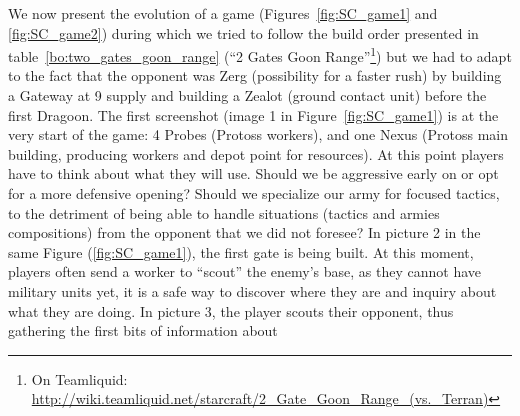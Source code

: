 We now present the evolution of a game (Figures~\ref{fig:SC_game1} and \ref{fig:SC_game2}) during which we tried to follow the build order presented in table~\ref{bo:two_gates_goon_range} (``2 Gates Goon Range''\footnote{On Teamliquid: \url{http://wiki.teamliquid.net/starcraft/2_Gate_Goon_Range_(vs._Terran)}}) but we had to adapt to the fact that the opponent was Zerg (possibility for a faster rush) by building a Gateway at 9 supply and building a Zealot (ground contact unit) before the first Dragoon. The first screenshot (image 1 in Figure~\ref{fig:SC_game1}) is at the very start of the game: 4 Probes (Protoss workers), and one Nexus (Protoss main building, producing workers and depot point for resources). At this point players have to think about what  they will use. Should we be aggressive early on or opt for a more defensive opening? Should we specialize our army for focused tactics, to the detriment of being able to handle situations (tactics and armies compositions) from the opponent that we did not foresee? In picture 2 in the same Figure (\ref{fig:SC_game1}), the first gate is being built. At this moment, players often send a worker to ``scout'' the enemy's base, as they cannot have military units yet, it is a safe way to discover where they are and inquiry about what they are doing. In picture 3, the player scouts their opponent, thus gathering the first bits of information about %
